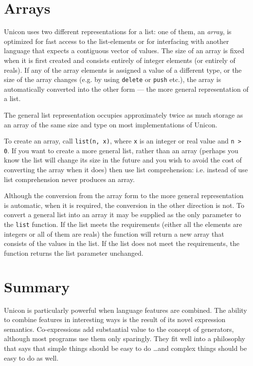 \section{Arrays}
Unicon uses two different representations for a list: one of them, an
{\em array}, is optimized for fast access to the list-elements or for
interfacing with another language that expects a contiguous vector of
values. The size of an array is fixed when it is first created and
consists entirely of integer elements (or entirely of reals). If any
of the array elements is assigned a value of a different type, or the
size of the array changes (e.g. by using \texttt{delete} or
\texttt{push} etc.), the array is automatically converted into the
other form --- the more general representation of a list.

The general list representation occupies approximately twice as much
storage as an array of the same size and type on most implementations
of Unicon.

To create an array, call \texttt{list(n, x)}, where \texttt{x} is an
integer or real value and \texttt{n > 0}. If you want to create a more
general list, rather than an array (perhaps you know the list will
change its size in the future and you wish to avoid the cost of
converting the array when it does) then use list comprehension:
i.e. instead of
\noindent use
\noindent list comprehension never produces an array.

Although the conversion from the array form to the more general
representation is automatic, when it is required, the conversion in the
other direction is not. To convert a general list into an array it may
be supplied as the only parameter to the \texttt{list} function. If
the list meets the requirements (either all the elements are integers
or all of them are reals) the function will return a new array that
consists of the values in the list. If the list does not meet the
requirements, the function returns the list parameter unchanged.

\section*{Summary}

Unicon is particularly powerful when language features are
combined. The ability to combine features in interesting ways is the
result of its novel expression semantics. Co-expressions add
substantial value to the concept of generators,
although most programs use them only sparingly. They fit well into a
philosophy that says that simple things should be easy to do \ldots and
complex things should be easy to do as well.

